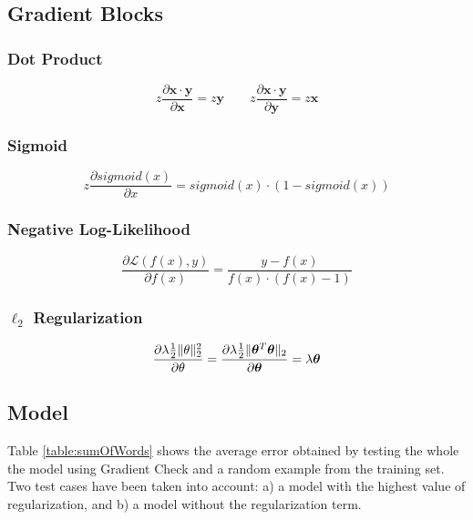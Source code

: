 \documentclass{article} %
\begin{document}
\subsection{Gradient Blocks}

\subsubsection*{Dot Product}

\begin{equation}
z\frac{\partial \bm{x} \cdot \bm{y}}{\partial \bm{x}} = z\bm{y}
\qquad
z\frac{\partial \bm{x} \cdot \bm{y}}{\partial \bm{y}} = z\bm{x}
\end{equation}

\subsubsection*{Sigmoid}

\begin{equation}
z\frac{\partial sigmoid(x)}{\partial x} = sigmoid(x) \cdot (1-sigmoid(x))
\end{equation}

\subsubsection*{Negative Log-Likelihood}

\begin{equation}
\frac{\partial \mathcal{L}(f(x),y)}{\partial f(x)} = \frac{y-f(x)}{f(x)\cdot(f(x)-1)}
\end{equation}

\subsubsection*{$\ell_2$ Regularization}

\DeclarePairedDelimiter{\norm}{\lVert}{\rVert}

\begin{equation}
\frac{\partial \lambda\frac{1}{2}\norm{\theta}_{2}^2}{\partial \theta} = \frac{\partial \lambda\frac{1}{2}\norm{\bm{\theta}^{T}\bm{\theta}}_{2}}{\partial \bm{\theta}} = \lambda\bm{\theta}
\end{equation}

\subsection{Model}

Table \ref{table:sumOfWords} shows the average error obtained by testing the whole the model using Gradient Check and a random example from the training set. Two test cases have been taken into account: a) a model with the highest value of regularization, and b) a model without the regularization term.
\end{document}
